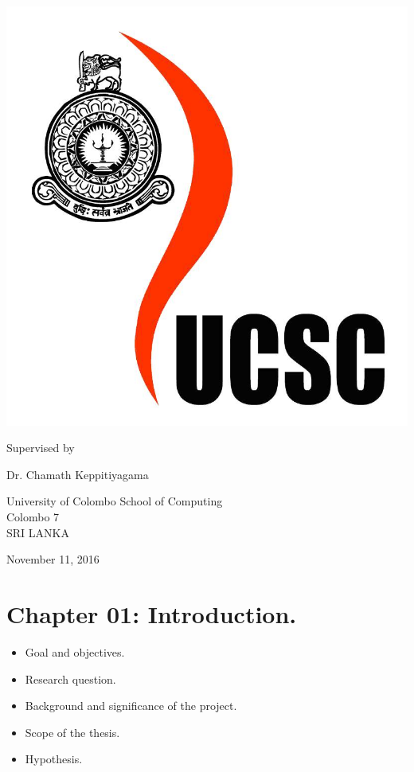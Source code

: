 \documentclass[11pt]{article}
\numberwithin{figure}{section}
\numberwithin{table}{section}
\begin{document}
\begin{titlepage}
	\includegraphics[scale=0.1]{ucsc.png}
	
	\vfill    
	
	{Supervised by}
	
	\vspace*{0.3\baselineskip}
	
	{\Large Dr. Chamath Keppitiyagama}
	

	
	\vspace*{0.5\baselineskip}
	
	
	
	\vfill
	
	{University of Colombo School of Computing\\
		Colombo 7\\
		SRI LANKA}
	
	\vfill
	{November 11, 2016}
	


\end{titlepage}

\newpage
\section*{Chapter 01: Introduction.}
\begin{itemize}
  \item Goal and objectives.
  \item Research question.
  \item Background and significance of the project.
  \item Scope of the thesis.
  \item Hypothesis.
\end{itemize}
\end{document}
